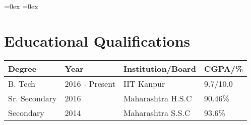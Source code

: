 \setlength\extrarowheight{3pt}  %
\aboverulesep=0ex  %
\belowrulesep=0ex  %

\section*{Educational Qualifications}
\begin{tabularx}{\textwidth}{|L|L|L|L|}

\toprule
\textbf{Degree} & \textbf{Year}  & \textbf{Institution/Board} & \textbf{CGPA/\%}\\
\midrule
B. Tech         & 2016 - Present & IIT Kanpur                 & 9.7/10.0\\
Sr. Secondary   & 2016           & Maharashtra H.S.C          & 90.46\%\\
Secondary       & 2014           & Maharashtra S.S.C          & 93.6\%\\
\bottomrule

\end{tabularx}
